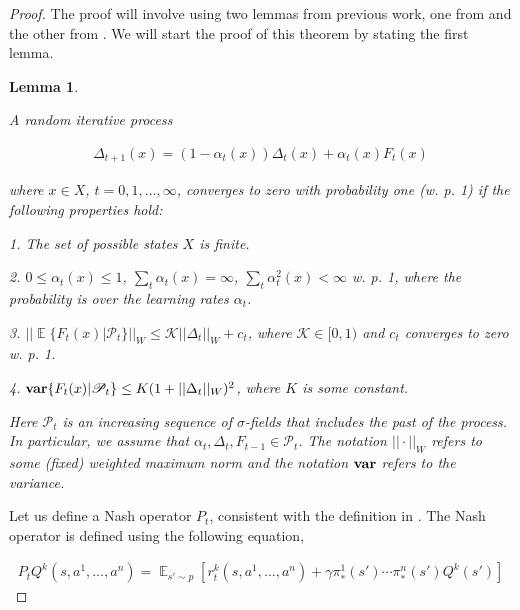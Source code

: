 \documentclass[jair, twoside,11pt,theapa]{article}
\DeclareMathOperator{\E}{\mathbb{E}}
\newtheorem{lemm}{Lemma}
\begin{document}
\begin{proof}
The proof will involve using two lemmas from previous work, one from \citet{jaakkola1994convergence} and the other from \citet{hu2003nash}. We will start the proof of this theorem by stating the first lemma. 



\begin{lemm}\label{lemma:randomprocess}

A random iterative process 

\begin{equation}\label{eq:deltaeq}
\begin{array}{l}
     \Delta_{t+1}(x) = (1 - \alpha_t(x))\Delta_t(x) + \alpha_t(x) F_t(x)
\end{array}{}
\end{equation}

\noindent where $x \in X$, $t = 0,1, \ldots, \infty$, converges to zero with probability one (w. p. 1) if the following properties hold: 
 
1. The set of possible states $X$ is finite. 

2. $0 \leq \alpha_t(x) \leq 1$, $\sum_t \alpha_t(x) = \infty$, $\sum_t \alpha^2_t(x) < \infty$ w. p. 1, where the probability is over the learning rates $\alpha_t$. 

3. $|| \E \{{F_t(x)|\mathscr{P}_t}\} ||_W \leq \mathscr{K} ||\Delta_t||_W + c_t$, where $\mathscr{K} \in [0,1)$ and $c_t$ converges to zero w. p. 1. 

4. $\textrm{\textbf{var}}\{F_t(x) | \mathscr{P}_t\} \leq K(1 + ||\Delta_t||_W)^2$, where $K$ is some constant. 

\noindent Here $\mathscr{P}_t$ is an increasing sequence of $\sigma$-fields that includes the past of the process.  In particular, we assume that $\alpha_t, \Delta_t, F_{t-1} \in \mathscr{P}_t$. The notation $||\cdot||_W$ refers to some (fixed) weighted maximum norm and the notation $\textrm{\textbf{var}}$ refers to the variance. 
 
 
\end{lemm}


Let us define a Nash operator $P_t$, consistent with the definition in \cite{hu2003nash}. The Nash operator is defined using the following equation, 

\begin{equation}\label{eq:nashoperator}
\begin{array}{l}
    P_t Q^k(s, a^1, \ldots, a^n) = \E_{s' \sim p} [r^k_t(s,a^1, \ldots, a^n)  + \gamma \pi^1_{*} (s') \cdots \pi^n_{*}(s') Q^k(s')]
    \end{array}
\end{equation}


\end{proof}
\end{document}
